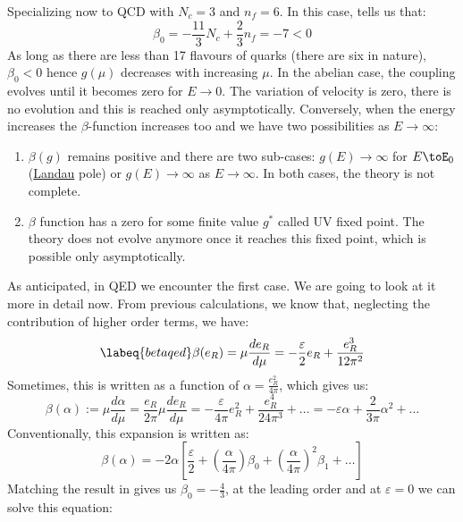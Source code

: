 \documentclass[../main.tex]{subfiles}
\begin{document}
Specializing now to QCD with $N_c=3$ and $n_f=6$. In this case,  tells us that:
\[
\beta_0=-\frac{11}{3}N_c+\frac{2}{3}n_f=-7<0
\]
As long as there are less than 17 flavours of quarks (there are six in nature), $\beta_0<0$ hence $g(\mu)$ decreases with increasing $\mu$.
In the abelian case, the coupling evolves until it becomes zero for $E\to0$. The variation of velocity is zero, there is no evolution and this is reached only asymptotically. Conversely, when the energy increases the $\beta$-function increases too and we have two possibilities as $E\to\infty$: 
\begin{enumerate}
    \item $\beta(g)$ remains positive and there are two sub-cases: $g(E)\to\infty$ for $E\toE_0$ (\href{https://en.wikipedia.org/wiki/Lev_Landau}{Landau} pole) or $g(E)\to\infty$ as $E\to\infty$. In both cases, the theory is not complete.
    \item $\beta$ function has a zero for some finite value $g^*$ called UV fixed point. The theory does not evolve anymore once it reaches this fixed point, which is possible only asymptotically.
\end{enumerate}
As anticipated, in QED we encounter the first case. We are going to look at it more in detail now. From previous calculations, we know that, neglecting the contribution of higher order terms, we have:
\begin{equation}
\labeq{betaqed}
\beta(e_R)=\mu\frac{de_R}{d\mu}=-\frac{\varepsilon}{2}e_R+\frac{e_R^3}{12\pi^2}
\end{equation}
Sometimes, this is written as a function of $\alpha=\frac{e_R^2}{4\pi}$, which gives us:
\[
\beta(\alpha):=\mu\frac{d\alpha}{d\mu}=\frac{e_R}{2\pi}\mu\frac{de_R}{d\mu}=-\frac{\varepsilon}{4\pi}e_R^2+\frac{e_R^4}{24\pi^3}+\dots=-\varepsilon\alpha+\frac{2}{3\pi}\alpha^2+\dots
\]
Conventionally, this expansion is written as:
\[
\beta(\alpha)=-2\alpha\left[\frac{\varepsilon}{2}+\left(\frac{\alpha}{4\pi}\right)\beta_0+\left(\frac{\alpha}{4\pi}\right)^2\beta_1+\dots\right]
\]
Matching the result in  gives us $\beta_0=-\frac{4}{3}$, at the leading order and at $\varepsilon=0$ we can solve this equation:
\end{document}

